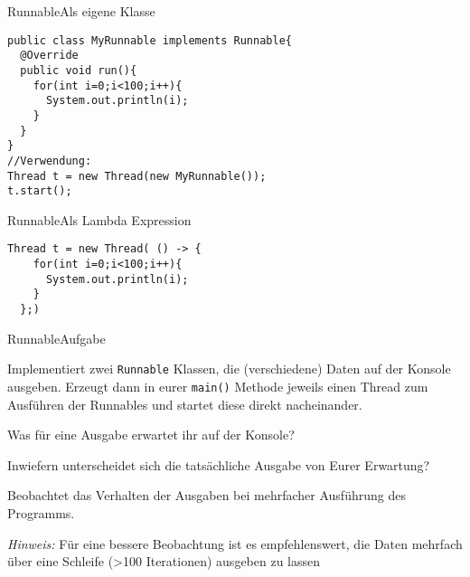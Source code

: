 \begin{frame}[fragile]{Runnable}{Als eigene Klasse}
\lstset{style=java}
\begin{lstlisting}
public class MyRunnable implements Runnable{
  @Override
  public void run(){
    for(int i=0;i<100;i++){
      System.out.println(i);
    }
  }
}
//Verwendung:
Thread t = new Thread(new MyRunnable());
t.start();
\end{lstlisting}
\end{frame}

\begin{frame}[fragile]{Runnable}{Als Lambda Expression}
\lstset{style=java}
\begin{lstlisting}
Thread t = new Thread( () -> {
    for(int i=0;i<100;i++){
      System.out.println(i);
    }
  };)
\end{lstlisting}
\end{frame}

\begin{frame}{Runnable}{Aufgabe}
    \begin{alertblock}{}
    Implementiert zwei \texttt{Runnable} Klassen, die (verschiedene) Daten auf der Konsole ausgeben. Erzeugt dann in eurer \texttt{main()} Methode jeweils einen Thread zum Ausführen der Runnables und startet diese direkt nacheinander. 
    
    Was für eine Ausgabe erwartet ihr auf der Konsole?
    
    Inwiefern unterscheidet sich die tatsächliche Ausgabe von Eurer Erwartung?
    
    Beobachtet das Verhalten der Ausgaben bei mehrfacher Ausführung des Programms.
    
    \textit{Hinweis:} Für eine bessere Beobachtung ist es empfehlenswert, die Daten mehrfach über eine Schleife (>100 Iterationen) ausgeben zu lassen
    \end{alertblock}
\end{frame}